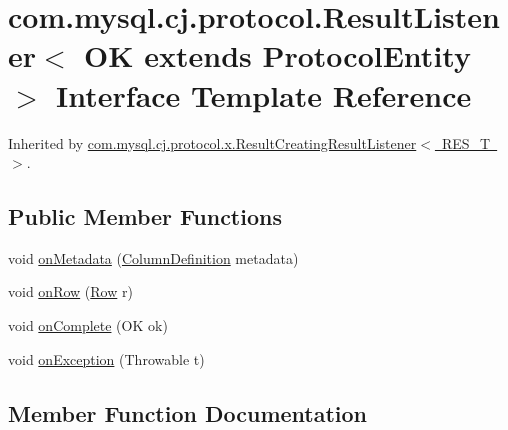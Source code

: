 \hypertarget{interfacecom_1_1mysql_1_1cj_1_1protocol_1_1_result_listener}{}\section{com.\+mysql.\+cj.\+protocol.\+Result\+Listener$<$ OK extends Protocol\+Entity $>$ Interface Template Reference}
\label{interfacecom_1_1mysql_1_1cj_1_1protocol_1_1_result_listener}


Inherited by \mbox{\hyperlink{classcom_1_1mysql_1_1cj_1_1protocol_1_1x_1_1_result_creating_result_listener}{com.\+mysql.\+cj.\+protocol.\+x.\+Result\+Creating\+Result\+Listener$<$ R\+E\+S\+\_\+\+T $>$}}.

\subsection*{Public Member Functions}
\begin{DoxyCompactItemize}
\item 
void \mbox{\hyperlink{interfacecom_1_1mysql_1_1cj_1_1protocol_1_1_result_listener_a7252b90a18c4d3dc585cb7ded00b06f9}{on\+Metadata}} (\mbox{\hyperlink{interfacecom_1_1mysql_1_1cj_1_1protocol_1_1_column_definition}{Column\+Definition}} metadata)
\item 
void \mbox{\hyperlink{interfacecom_1_1mysql_1_1cj_1_1protocol_1_1_result_listener_a5f0cc53ad220c8c4ca450c9dae00de5c}{on\+Row}} (\mbox{\hyperlink{interfacecom_1_1mysql_1_1cj_1_1result_1_1_row}{Row}} r)
\item 
void \mbox{\hyperlink{interfacecom_1_1mysql_1_1cj_1_1protocol_1_1_result_listener_a53ba13bc02f2fa5d3f310b9f46f11ece}{on\+Complete}} (OK ok)
\item 
void \mbox{\hyperlink{interfacecom_1_1mysql_1_1cj_1_1protocol_1_1_result_listener_ab3ea59c10a6ea7cba54923bc4237dddc}{on\+Exception}} (Throwable t)
\end{DoxyCompactItemize}


\subsection{Member Function Documentation}
\mbox{\label{interfacecom_1_1mysql_1_1cj_1_1protocol_1_1_result_listener_a53ba13bc02f2fa5d3f310b9f46f11ece}} 
